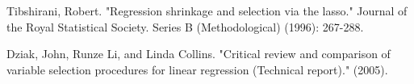\documentclass[a4paper,onecolumn]{article}
\theoremstyle{remark}
\begin{document}
\begin{thebibliography}{9}
%
Tibshirani, Robert. 
"Regression shrinkage and selection via the lasso." 
Journal of the Royal Statistical Society. Series B (Methodological) (1996): 267-288.

%
Dziak, John, Runze Li, and Linda Collins. 
"Critical review and comparison of variable selection procedures for linear regression (Technical report)." (2005).

%
%
%
%
%
%
%
%
%
%

\end{thebibliography}
\end{document}
